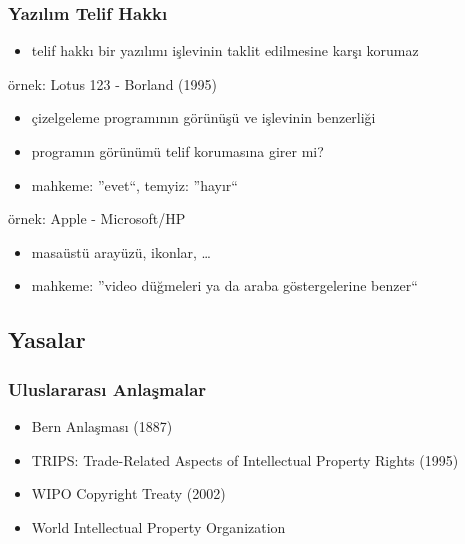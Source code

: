\documentclass[dvipsnames]{beamer}
\theoremstyle{plain}
\begin{document}
\begin{frame}
  \frametitle{Yazılım Telif Hakkı}

  \begin{itemize}
    \item telif hakkı bir yazılımı işlevinin taklit edilmesine karşı korumaz
  \end{itemize}

  \begin{exampleblock}{örnek: Lotus 123 - Borland (1995)}
    \begin{itemize}
      \item çizelgeleme programının görünüşü ve işlevinin benzerliği
      \item programın görünümü telif korumasına girer mi?
      \item mahkeme: ''evet``, temyiz: ''hayır``
    \end{itemize}
  \end{exampleblock}

  \pause
  \begin{exampleblock}{örnek: Apple - Microsoft/HP}
    \begin{itemize}
      \item masaüstü arayüzü, ikonlar, \ldots
      \item mahkeme: ''video düğmeleri ya da araba göstergelerine benzer``
    \end{itemize}
  \end{exampleblock}
\end{frame}

\subsection{Yasalar}

\begin{frame}
  \frametitle{Uluslararası Anlaşmalar}

  \begin{itemize}
    \item Bern Anlaşması (1887)
    \item TRIPS: Trade-Related Aspects of Intellectual Property Rights (1995)

    \medskip
    \item WIPO Copyright Treaty (2002)
    \item World Intellectual Property Organization
  \end{itemize}
\end{frame}
\end{document}
